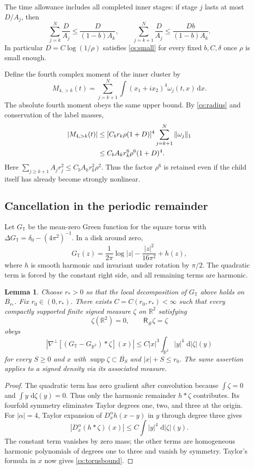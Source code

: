 \documentclass[11pt]{amsart}
\newtheorem{lemma}[theorem]{Lemma}
\theoremstyle{remark}
\numberwithin{equation}{section}
\newcommand{\R}{\mathbb R}
\newcommand{\dd}{\,\mathrm d}
\begin{document}
The time allowance includes all completed inner stages: if stage $j$ lasts at most $D/A_j$, then
\[
 \sum_{j=k}^N\frac D{A_j}\le\frac D{(1-b)A_k},\qquad
 \sum_{j=k+1}^N\frac D{A_j}\le\frac {Db}{(1-b)A_k}.
\]
In particular $D=C\log(1/\rho)$ satisfies \eqref{cs:small} for every fixed $b,C,\delta$ once $\rho$ is small enough.

Define the fourth complex moment of the inner cluster by
\[
 M_{4,>k}(t)=\sum_{j=k+1}^N\int (x_1+ix_2)^4\omega_j(t,x)\dd x.
\]
The absolute fourth moment obeys the same upper bound. By \eqref{cs:radius} and conservation of the label masses,
\begin{align}
 |M_{4,>k}(t)|
 &\le [C_b r_k\rho(1+D)]^4\sum_{j=k+1}^N\|\omega_j\|_1\notag\\
 &\le C_b A_kr_k^6\rho^6(1+D)^4.
 \label{cs:momentbound}
\end{align}
Here $\sum_{j\ge k+1}A_jr_j^2\le C_bA_kr_k^2\rho^2$. Thus the factor $\rho^6$ is retained even if the child itself has already become strongly nonlinear.

\subsection{Cancellation in the periodic remainder}\label{cs:torussection}
Let $G_{\mathbb T}$ be the mean-zero Green function for the square torus with $\Delta G_{\mathbb T}=\delta_0-(4\pi^2)^{-1}$. In a disk around zero,
\[
 G_{\mathbb T}(z)=\frac1{2\pi}\log|z|-\frac{|z|^2}{16\pi^2}+h(z),
\]
where $h$ is smooth harmonic and invariant under rotation by $\pi/2$. The quadratic term is forced by the constant right side, and all remaining terms are harmonic.

\begin{lemma}
\label{cs:toruslemma}
Choose $r_*>0$ so that the local decomposition of $G_{\mathbb T}$
above holds on $B_{r_*}$. Fix $r_0\in(0,r_*)$.
There exists $C=C(r_0,r_*)<\infty$ such that every compactly
supported finite signed measure $\zeta$ on $\R^2$ satisfying
\[
 \zeta(\R^2)=0,\qquad \mathsf R_\#\zeta=\zeta
\]
obeys
\begin{equation}\label{cs:torusbound}
 \left|\nabla^\perp[(G_{\mathbb T}-G_{\R^2})*\zeta](x)\right|
 \le C|x|^3\int_{\R^2}|y|^4\,\dd|\zeta|(y)
\end{equation}
for every $S\ge0$ and $x$ with
$\operatorname{supp}\zeta\subset\overline{B_S}$ and $|x|+S\le r_0$.
The same assertion applies to a signed density via its associated measure.
\end{lemma}
\begin{proof}
The quadratic term has zero gradient after convolution because
$\int\zeta=0$ and $\int y\,\dd\zeta(y)=0$. Thus only the harmonic
remainder $h*\zeta$ contributes. Its fourfold symmetry eliminates
Taylor degrees one, two, and three at the origin.
For $|\alpha|=4$, Taylor expansion of $D_x^\alpha h(x-y)$ in $y$
through degree three gives
\[
 |D_x^\alpha(h*\zeta)(x)|\le C\int|y|^4\,\dd|\zeta|(y).
\]
The constant term vanishes by zero mass; the other terms are
homogeneous harmonic polynomials of degrees one to three and
vanish by symmetry. Taylor's formula in $x$ now gives
\eqref{cs:torusbound}.
\end{proof}
\end{document}
